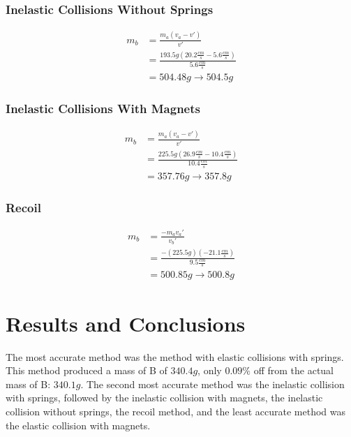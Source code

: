 \documentclass[12pt]{article}
\begin{document}
\subsubsection{Inelastic Collisions Without Springs}
\begin{equation}
	\begin{aligned}
		m_b & =\frac{m_a(v_a-v')}{v'}                                           \\
		    & =\frac{193.5g(20.2\frac{cm}{s}-5.6\frac{cm}{s})}{5.6\frac{cm}{s}} \\
		    & =504.48g\rightarrow504.5g                                         
	\end{aligned}
\end{equation}
\subsubsection{Inelastic Collisions With Magnets}
\begin{equation}
	\begin{aligned}
		m_b & =\frac{m_a(v_a-v')}{v'}                                             \\
		    & =\frac{225.5g(26.9\frac{cm}{s}-10.4\frac{cm}{s})}{10.4\frac{cm}{s}} \\
		    & =357.76g\rightarrow357.8g                                           
	\end{aligned}
\end{equation}
\subsubsection{Recoil}
\begin{equation}
	\begin{aligned}
		m_b & =\frac{-m_av_a'}{v_b'}                                \\
		    & =\frac{-(225.5g)(-21.1\frac{cm}{s})}{9.5\frac{cm}{s}} \\
		    & =500.85g\rightarrow500.8g                             
	\end{aligned}
\end{equation}

\newpage
\section{Results and Conclusions}
The most accurate method was the method with elastic collisions with springs. This method produced a mass of B of $340.4g$, only $0.09\%$ off from the actual mass of B: $340.1g$. The second most accurate method was the inelastic collision with springs, followed by the inelastic collision with magnets, the inelastic collision without springs, the recoil method, and the least accurate method was the elastic collision with magnets.
\end{document}
